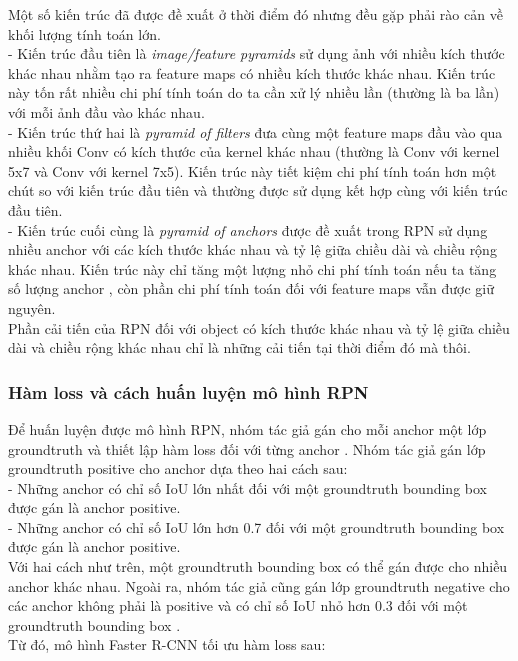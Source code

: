 {    \noindent
    Một số kiến trúc đã được đề xuất ở thời điểm đó nhưng đều gặp phải rào cản về khối lượng tính toán lớn. \\
    - Kiến trúc đầu tiên là \textit{image/feature pyramids} sử dụng ảnh với nhiều kích thước khác nhau nhằm tạo ra feature maps  có nhiều kích thước khác nhau.
    Kiến trúc này tốn rất nhiều chi phí tính toán do ta cần xử lý nhiều lần (thường là ba lần) với mỗi ảnh đầu vào khác nhau. \\
    - Kiến trúc thứ hai là \textit{pyramid of filters} đưa cùng một feature maps  đầu vào qua nhiều khối Conv có kích thước của kernel khác nhau (thường là Conv với kernel 5x7 và Conv với kernel 7x5).
    Kiến trúc này tiết kiệm chi phí tính toán hơn một chút so với kiến trúc đầu tiên và thường được sử dụng kết hợp cùng với kiến trúc đầu tiên. \\
    - Kiến trúc cuối cùng là \textit{pyramid of anchors} được đề xuất trong RPN sử dụng nhiều anchor  với các kích thước khác nhau và tỷ lệ giữa chiều dài và chiều rộng khác nhau.
    Kiến trúc này chỉ tăng một lượng nhỏ chi phí tính toán nếu ta tăng số lượng anchor , còn phần chi phí tính toán đối với feature maps  vẫn được giữ nguyên. \\
    Phần cải tiến của RPN đối với object có kích thước khác nhau và tỷ lệ giữa chiều dài và chiều rộng khác nhau chỉ là những cải tiến tại thời điểm đó mà thôi.

    \subsubsection{Hàm loss và cách huấn luyện mô hình RPN}
    Để huấn luyện được mô hình RPN, nhóm tác giả gán cho mỗi anchor  một lớp groundtruth  và thiết lập hàm loss đối với từng anchor .
    Nhóm tác giả gán lớp groundtruth  positive cho anchor  dựa theo hai cách sau: \\
    - Những anchor  có chỉ số IoU  lớn nhất đối với một groundtruth  bounding box  được gán là anchor  positive. \\
    - Những anchor  có chỉ số IoU  lớn hơn 0.7 đối với một groundtruth  bounding box  được gán là anchor  positive. \\
    Với hai cách như trên, một groundtruth  bounding box  có thể gán được cho nhiều anchor  khác nhau.
    Ngoài ra, nhóm tác giả cũng gán lớp groundtruth  negative cho các anchor  không phải là positive và có chỉ số IoU  nhỏ hơn 0.3 đối với một groundtruth  bounding box . \\
    Từ đó, mô hình Faster R-CNN tối ưu hàm loss sau:

}
